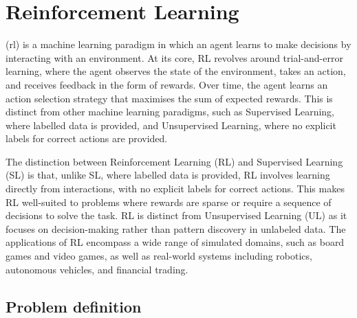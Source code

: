 \section{Reinforcement Learning}\label{section:bg:reinforcement-learning}

 (\acrshort{rl}) is a machine learning paradigm in which an agent learns to make
decisions by interacting with an environment. %
At its core, RL revolves around trial-and-error learning, where the agent observes the state of the environment, takes
an action, and receives feedback in the form of rewards.
Over time, the agent learns an action selection strategy that maximises the sum of expected rewards.
This is distinct from other machine learning paradigms, such as Supervised Learning, where labelled data is provided,
and Unsupervised Learning, where no explicit labels for correct actions are provided.

The distinction between Reinforcement Learning (RL) and Supervised Learning (SL) is that, unlike SL, where labelled
data is provided, RL involves learning directly from interactions, with no explicit labels for correct actions.
This makes RL well-suited to problems where rewards are sparse or require a sequence of decisions to solve the task.
RL is distinct from Unsupervised Learning (UL) as it focuses on decision-making rather than pattern discovery in unlabeled data.
The applications of RL encompass a wide range of simulated domains, such as board games and video games, as well as real-world 
systems including robotics, autonomous vehicles, and financial trading.

\subsection{Problem definition}\label{subsection:bg:rl:problem_def}

